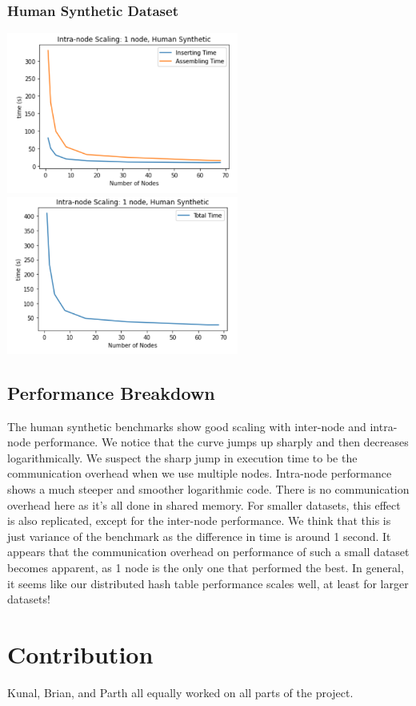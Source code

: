 \documentclass{article}
\begin{document}
\subsubsection{Human Synthetic Dataset}
\centerline{\includegraphics[width=3in]{figures/intra-human-prof.png}\includegraphics[width=3in]{figures/intra-human.png}}


\subsection{Performance Breakdown}
The human synthetic benchmarks show good scaling with inter-node and intra-node performance. We notice that the curve jumps up sharply and then decreases logarithmically. We suspect the sharp jump in execution time to be the communication overhead when we use multiple nodes. Intra-node performance shows a much steeper and smoother logarithmic code. There is no communication overhead here as it’s all done in shared memory. For smaller datasets, this effect is also replicated, except for the inter-node performance. We think that this is just variance of the benchmark as the difference in time is around 1 second. It appears that the communication overhead on performance of such a small dataset becomes apparent, as 1 node is the only one that performed the best. In general, it seems like our distributed hash table performance scales well, at least for larger datasets!

\section{Contribution}
Kunal, Brian, and Parth all equally worked on all parts of the project.


 
\end{document}
